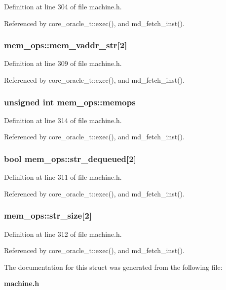 Definition at line 304 of file machine.h.

Referenced by core\_\-oracle\_\-t::exec(), and md\_\-fetch\_\-inst().
\subsubsection[{mem\_\-vaddr\_\-str}]{ {\bf mem\_\-ops::mem\_\-vaddr\_\-str}[2]}\label{structmem__ops_2f0d7904460f2963b06f6a2918594692}




Definition at line 309 of file machine.h.

Referenced by core\_\-oracle\_\-t::exec(), and md\_\-fetch\_\-inst().
\subsubsection[{memops}]{\setlength{\rightskip}{0pt plus 5cm}unsigned int {\bf mem\_\-ops::memops}}\label{structmem__ops_866a5a8c45748506a42f030a301ea85e}




Definition at line 314 of file machine.h.

Referenced by core\_\-oracle\_\-t::exec(), and md\_\-fetch\_\-inst().
\subsubsection[{str\_\-dequeued}]{\setlength{\rightskip}{0pt plus 5cm}bool {\bf mem\_\-ops::str\_\-dequeued}[2]}\label{structmem__ops_4158b3e42772696b3f6569c7fc2b1401}




Definition at line 311 of file machine.h.

Referenced by core\_\-oracle\_\-t::exec(), and md\_\-fetch\_\-inst().
\subsubsection[{str\_\-size}]{ {\bf mem\_\-ops::str\_\-size}[2]}\label{structmem__ops_66a55324ea75d2ce5951a6dbfe43b665}




Definition at line 312 of file machine.h.

Referenced by core\_\-oracle\_\-t::exec(), and md\_\-fetch\_\-inst().

The documentation for this struct was generated from the following file:\begin{CompactItemize}
\item 
{\bf machine.h}\end{CompactItemize}
